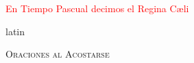 \documentclass[9pt]{article}
\begin{document}
\begin{multicols}{2}
      \textcolor{red}{En Tiempo Pascual decimos el Regina C{\ae}li}

      \begin{otherlanguage*}{latin}
            
            

            
      \end{otherlanguage*}

      \vspace{1mm}

      

\end{multicols}

\newpage

\begin{center}
      \textsc{\Large{Oraciones al Acostarse}}
\end{center}
\end{document}
